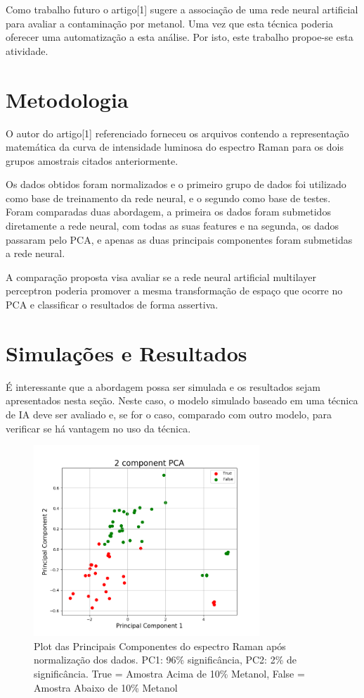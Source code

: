 \documentclass{article}
\begin{document}
Como trabalho futuro o artigo[1] sugere a associação de uma rede neural artificial para avaliar a contaminação por metanol. Uma vez que esta técnica poderia oferecer uma automatização a esta análise. Por isto, este trabalho propoe-se esta atividade.

\vspace{2cm}
\section{Metodologia}
\vspace{1cm} O autor do artigo[1] referenciado forneceu os arquivos contendo a representação matemática da curva de intensidade luminosa do espectro Raman para os dois grupos amostrais citados anteriormente.

Os dados obtidos foram normalizados e o primeiro grupo de dados foi utilizado como base de treinamento da rede neural, e o segundo como base de testes. Foram comparadas duas abordagem, a primeira os dados foram submetidos diretamente a rede neural, com todas as suas features e na segunda, os dados passaram pelo PCA, e apenas as duas principais componentes foram submetidas a rede neural.

A comparação proposta visa avaliar se a rede neural artificial multilayer perceptron poderia promover a mesma transformação de espaço que ocorre no PCA e classificar o resultados de forma assertiva.

\vspace{2cm}
\section{Simulações e Resultados}
\vspace{1cm} É interessante que a abordagem possa ser simulada e
os resultados sejam apresentados nesta seção. Neste caso, o modelo
simulado baseado em uma técnica de IA deve ser avaliado e, se for o caso,
comparado com outro modelo, para verificar se há vantagem no uso
da técnica. \vspace{2cm}

\begin{figure}[ht]
\centering
\includegraphics[width=8.5cm]{pca}
\caption{Plot das Principais Componentes do espectro Raman após normalização dos dados. PC1: 96\% significância, PC2: 2\% de significância. True = Amostra Acima de 10\% Metanol, False = Amostra Abaixo de 10\% Metanol}
\label{pca}
\end{figure}
\end{document}
